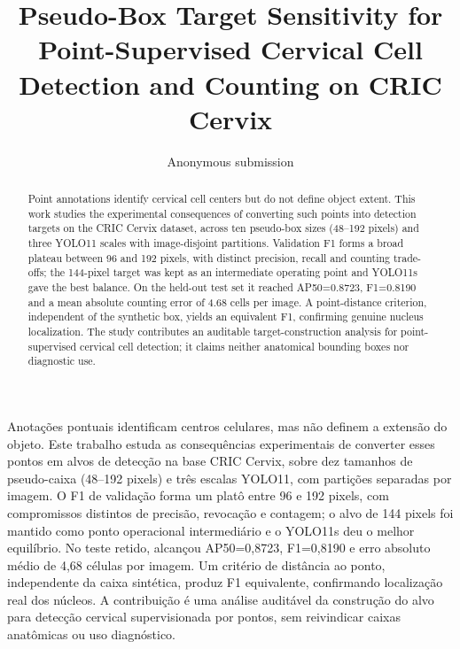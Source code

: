 \documentclass[12pt]{article}
\title{Pseudo-Box Target Sensitivity for Point-Supervised Cervical Cell Detection and Counting on CRIC Cervix}
\author{Anonymous submission}
\begin{document}
\maketitle

\begin{abstract}
Point annotations identify cervical cell centers but do not define object
extent. This work studies the experimental consequences of converting such
points into detection targets on the CRIC Cervix dataset, across ten pseudo-box
sizes (48--192 pixels) and three YOLO11 scales with image-disjoint partitions.
Validation F1 forms a broad plateau between 96 and 192 pixels, with distinct
precision, recall and counting trade-offs; the 144-pixel target was kept as an
intermediate operating point and YOLO11s gave the best balance. On the held-out
test set it reached AP50=0.8723, F1=0.8190 and a mean absolute counting error of
4.68 cells per image. A point-distance criterion, independent of the synthetic
box, yields an equivalent F1, confirming genuine nucleus localization. The study
contributes an auditable target-construction analysis for point-supervised
cervical cell detection; it claims neither anatomical bounding boxes nor
diagnostic use.
\end{abstract}

\begin{resumo}
Anota\c{c}\~oes pontuais identificam centros celulares, mas n\~ao definem a
extens\~ao do objeto. Este trabalho estuda as consequ\^encias experimentais de
converter esses pontos em alvos de detec\c{c}\~ao na base CRIC Cervix, sobre dez
tamanhos de pseudo-caixa (48--192 pixels) e tr\^es escalas YOLO11, com
parti\c{c}\~oes separadas por imagem. O F1 de valida\c{c}\~ao forma um plat\^o
entre 96 e 192 pixels, com compromissos distintos de precis\~ao, revoca\c{c}\~ao e
contagem; o alvo de 144 pixels foi mantido como ponto operacional intermedi\'ario
e o YOLO11s deu o melhor equil\'ibrio. No teste retido, alcan\c{c}ou AP50=0,8723,
F1=0,8190 e erro absoluto m\'edio de 4,68 c\'elulas por imagem. Um crit\'erio de
dist\^ancia ao ponto, independente da caixa sint\'etica, produz F1 equivalente,
confirmando localiza\c{c}\~ao real dos n\'ucleos. A contribui\c{c}\~ao \'e uma
an\'alise audit\'avel da constru\c{c}\~ao do alvo para detec\c{c}\~ao cervical
supervisionada por pontos, sem reivindicar caixas anat\^omicas ou uso
diagn\'ostico.
\end{resumo}










\end{document}
